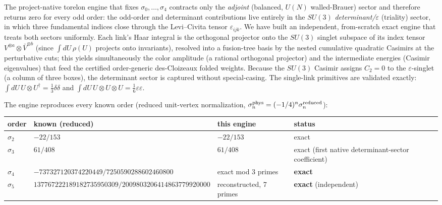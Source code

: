 \documentclass[11pt]{article}
\begin{document}
The project-native torelon engine that fixes $\sigma_0,\dots,\sigma_4$ contracts only
the \emph{adjoint} (balanced, $U(N)$ walled-Brauer) sector and therefore returns zero for
every odd order: the odd-order and determinant contributions live entirely in the
$SU(3)$ \emph{determinant/$\varepsilon$} (triality) sector, in which three fundamental
indices close through the Levi--Civita tensor $\varepsilon_{ijk}$. We have built an
independent, from-scratch exact engine that treats both sectors uniformly. Each link's
Haar integral is the orthogonal projector onto the $SU(3)$ singlet subspace of its index
tensor $V^{\otimes a}\otimes\bar V^{\otimes b}$ (since $\int dU\,\rho(U)$ projects onto
invariants), resolved into a fusion-tree basis by the nested cumulative quadratic
Casimirs at the perturbative cuts; this yields simultaneously the color amplitude (a
rational orthogonal projector) and the intermediate energies (Casimir eigenvalues) that
feed the certified order-generic des-Cloizeaux folded weights. Because the $SU(3)$ Casimir
assigns $C_2=0$ to the $\varepsilon$-singlet (a column of three boxes), the determinant
sector is captured without special-casing. The single-link primitives are validated
exactly: $\int dU\,U\otimes U^\dagger=\tfrac13\delta\delta$ and
$\int dU\,U\otimes U\otimes U=\tfrac16\varepsilon\varepsilon$.

The engine reproduces every known order (reduced unit-vertex normalization,
$\sigma_n^{\rm phys}=(-1/4)^n\sigma_n^{\rm reduced}$):

\begin{center}
\begin{tabular}{llll}
\toprule
order & known (reduced) & this engine & status \\
\midrule
$\sigma_2$ & $-22/153$ & $-22/153$ & exact \\
$\sigma_3$ & $61/408$ & $61/408$ & exact (first native determinant-sector coefficient) \\
$\sigma_4$ & $-737327120374220449/7250590288602460800$ & exact mod $3$ primes & \textbf{exact} \\
$\sigma_5$ & $137767222189182735950309/2009803206414863779920000$ & reconstructed, 7 primes & \textbf{exact} (independent) \\
\bottomrule
\end{tabular}
\end{center}
\end{document}
